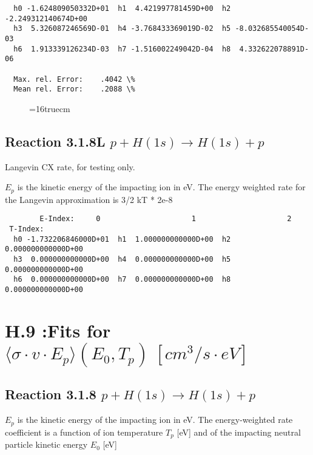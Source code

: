 \documentclass[12pt,dvipdfmx]{article}
\begin{document}
{\begin{small}\begin{verbatim}
  h0 -1.624809050332D+01  h1  4.421997781459D+00  h2 -2.249312140674D+00
  h3  5.326087246569D-01  h4 -3.768433369019D-02  h5 -8.032685540054D-03
  h6  1.913339126234D-03  h7 -1.516002249042D-04  h8  4.332622078891D-06

  Max. rel. Error:    .4042 \%
  Mean rel. Error:    .2088 \%

\end{verbatim}\end{small}

\begin{figure} \label{2.26Bl}
\epsfxsize=16truecm
\end{figure}
\newpage


\subsection{
Reaction 3.1.8L  $p + H(1s)  \rightarrow  H(1s) + p $
}
Langevin CX rate, for testing only.

$E_p$ is the kinetic energy of the impacting ion in eV.
The energy weighted rate for the Langevin approximation is
3/2 kT * 2e-8

\begin{small}\begin{verbatim}
        E-Index:     0                     1                     2
 T-Index:
  h0 -1.732206846000D+01  h1  1.000000000000D+00  h2  0.000000000000D+00
  h3  0.000000000000D+00  h4  0.000000000000D+00  h5  0.000000000000D+00
  h6  0.000000000000D+00  h7  0.000000000000D+00  h8  0.000000000000D+00

\end{verbatim}\end{small}

\section{H.9 :Fits for $\langle\sigma \cdot v \cdot E_p \rangle (E_0,T_p) \ [cm^3/s
\cdot eV]$}

\subsection{
Reaction 3.1.8   $p + H(1s)  \rightarrow  H(1s) + p $
}
$E_p$ is the kinetic energy of the impacting ion in eV.
The energy-weighted rate coefficient is a function of ion temperature $T_p$
[eV]  and of the impacting neutral particle kinetic energy $E_0$ [eV]

}
\end{document}
